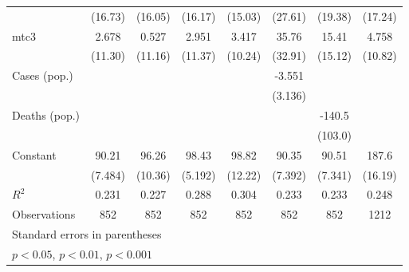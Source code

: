\documentclass{article}
\begin{document}
{\begin{longtable}{l*{7}{c}}
                &  (16.73)         &  (16.05)         &  (16.17)         &  (15.03)         &  (27.61)         &  (19.38)         &  (17.24)         \\
mtc3            &    2.678         &    0.527         &    2.951         &    3.417         &    35.76         &    15.41         &    4.758         \\
                &  (11.30)         &  (11.16)         &  (11.37)         &  (10.24)         &  (32.91)         &  (15.12)         &  (10.82)         \\
Cases (pop.)    &                  &                  &                  &                  &   -3.551         &                  &                  \\
                &                  &                  &                  &                  &  (3.136)         &                  &                  \\
Deaths (pop.)   &                  &                  &                  &                  &                  &   -140.5         &                  \\
                &                  &                  &                  &                  &                  &  (103.0)         &                  \\
Constant        &    90.21\sym{***}&    96.26\sym{***}&    98.43\sym{***}&    98.82\sym{***}&    90.35\sym{***}&    90.51\sym{***}&    187.6\sym{***}\\
                &  (7.484)         &  (10.36)         &  (5.192)         &  (12.22)         &  (7.392)         &  (7.341)         &  (16.19)         \\
\hline
\(R^{2}\)       &    0.231         &    0.227         &    0.288         &    0.304         &    0.233         &    0.233         &    0.248         \\
Observations    &      852         &      852         &      852         &      852         &      852         &      852         &     1212         \\
\hline\hline
\multicolumn{8}{l}{\footnotesize Standard errors in parentheses}\\
\multicolumn{8}{l}{\footnotesize \sym{*} \(p<0.05\), \sym{**} \(p<0.01\), \sym{***} \(p<0.001\)}\\
\end{longtable}
}
\end{document}
